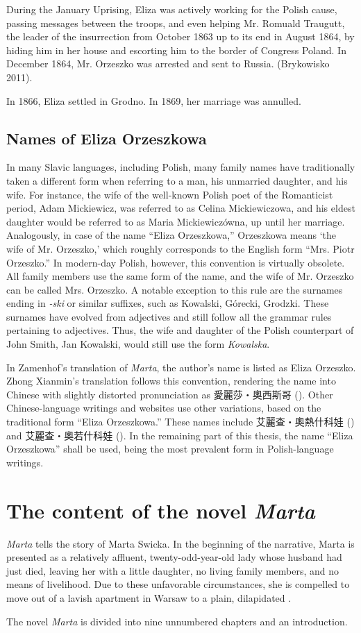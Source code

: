 During the January Uprising, Eliza was actively working for the Polish cause, passing messages between the troops, and even helping Mr. Romuald Traugutt, the leader of the insurrection from October 1863 up to its end in August 1864, by hiding him in her house and escorting him to the border of Congress Poland.
In December 1864, Mr. Orzeszko was arrested and sent to Russia.
(Brykowisko 2011).

In 1866, Eliza settled in Grodno. In 1869, her marriage was annulled.

\subsection{Names of Eliza Orzeszkowa}

In many Slavic languages, including Polish, many family names have traditionally taken a different form when referring to a man, his unmarried daughter, and his wife.
For instance, the wife of the well-known Polish poet of the Romanticist period, Adam Mickiewicz, was referred to as Celina Mickiewiczowa, and his eldest daughter would be referred to as Maria Mickiewiczówna, up until her marriage.
Analogously, in case of the name ``Eliza Orzeszkowa,'' Orzeszkowa means `the wife of Mr. Orzeszko,' which roughly corresponds to the English form ``Mrs. Piotr Orzeszko.''
In modern-day Polish, however, this convention is virtually obsolete.
All family members use the same form of the name, and the wife of Mr. Orzeszko can be called Mrs. Orzeszko.
A notable exception to this rule are the surnames ending in \textit{-ski} or similar suffixes, such as Kowalski, Górecki, Grodzki.
These surnames have evolved from adjectives and still follow all the grammar rules pertaining to adjectives.
Thus, the wife and daughter of the Polish counterpart of John Smith, Jan Kowalski, would still use the form \textit{Kowalska}. 

In Zamenhof's translation of \textit{Marta}, the author's name is listed as Eliza Orzeszko.
Zhong Xianmin's translation follows this convention, rendering the name into Chinese with slightly distorted pronunciation as 愛麗莎・奧西斯哥 ().
Other Chinese-language writings and websites use other variations, based on the traditional form ``Eliza Orzeszkowa.''
These names include 艾麗查・奧熱什科娃 () and 艾麗查・奧若什科娃 (). In the remaining part of this thesis, the name ``Eliza Orzeszkowa'' shall be used, being the most prevalent form in Polish-language writings.
\section{The content of the novel \textit{Marta}}
\textit{Marta} tells the story of Marta Swicka.
In the beginning of the narrative, Marta is presented as a relatively affluent, twenty-odd-year-old lady whose husband had just died, leaving her with a little daughter, no living family members, and no means of livelihood.
Due to these unfavorable circumstances, she is compelled to move out of a lavish apartment in Warsaw to a plain, dilapidated .

The novel \textit{Marta} is divided into nine unnumbered chapters and an introduction. 